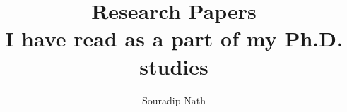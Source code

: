 \documentclass{article}
\begin{document}
\author{Souradip Nath}

\title{Research Papers \\ \large I have read as a part of my Ph.D. studies}
\maketitle




\nocite{*}



\vfill
\end{document}
